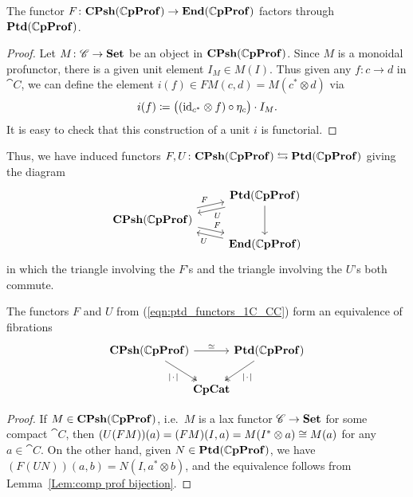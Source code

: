 \documentclass[11pt,oneside,article]{memoir}
\begin{document}
\begin{proposition}
    \label{Prop:canonical unit}
  The functor $F\colon\mathbf{CPsh}(\mathbb{C}\mathbf{pProf})\to\mathbf{End}(\mathbb{C}\mathbf{pProf})$ factors through $\mathbf{Ptd}(\mathbb{C}\mathbf{pProf})$.
\end{proposition}
\begin{proof}
  Let $M\colon \mathscr{C}\to\mathbf{Set}$ be an object in $\mathbf{CPsh}(\mathbb{C}\mathbf{pProf})$. Since $M$ is a monoidal
  profunctor, there is a given unit element $I_M\in M(I)$. Thus given any $f\colon c\to d$ in $
  \cat{C}$, we can define the element $i(f)\in FM(c,d)=M(c^*\otimes d)$ via
  \[
    i(f)\coloneqq\big((\mathrm{id}_{c^*}\otimes f)\circ\eta_c\big)\cdot I_M.
  \]
  It is easy to check that this construction of a unit $i$ is functorial.
\end{proof}

Thus, we have induced functors $F,U\colon\mathbf{CPsh}(\mathbb{C}\mathbf{pProf})\leftrightarrows\mathbf{Ptd}(\mathbb{C}\mathbf{pProf})$ giving
the diagram
\begin{equation} \begin{tikzcd}[row sep=tiny]
    \label{eqn:ptd_functors_1C_CC}
  & \Ptd(\dCompProf) \ar[dd] \ar[dl,shift left,"U"] \\
  \CPsh(\dCompProf) \ar[ur,shift left,"F"] \ar[dr,shift left,"F"] & \\
  & \End(\dCompProf) \ar[ul,shift left,"U"]
\end{tikzcd} \end{equation}
in which the triangle involving the $F$'s and the triangle involving the $U$'s both commute.

\begin{proposition}
    \label{Prop:ptd_prof_equivalence}
  The functors $F$ and $U$ from (\ref{eqn:ptd_functors_1C_CC}) form an equivalence of fibrations
  \[ \begin{tikzcd}[column sep=-.5em]
    \CPsh(\dCompProf) \ar[rr,"\equiv"] \ar[dr,two heads,"\MOb"']
      && \Ptd(\dCompProf) \ar[dl,two heads,"\MOb"] \\
    & \CompCat &
  \end{tikzcd} \]
\end{proposition}
\begin{proof}
  If $M\in\mathbf{CPsh}(\mathbb{C}\mathbf{pProf})$, i.e.\ $M$ is a lax functor $\mathscr{C}\to\mathbf{Set}$ for some compact
  $\cat{C}$, then $(U(FM))(a)=(FM)(I,a)=M(I^*\otimes a)\cong M(a)$ for any $a\in \cat{C}$. On the
  other hand, given $N\in\mathbf{Ptd}(\mathbb{C}\mathbf{pProf})$, we have $(F(UN))(a,b)=N(I,a^*\otimes b)$, and the
  equivalence follows from Lemma~\ref{Lem:comp prof bijection}.
\end{proof}
\end{document}
